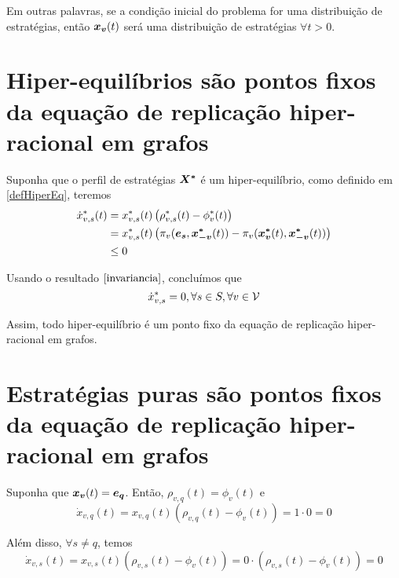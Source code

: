 Em outras palavras, se a condição inicial do problema for uma distribuição de estratégias, então $\boldsymbol{x_v}(t)$ será uma distribuição de estratégias $\forall t>0$.


\section{Hiper-equilíbrios são pontos fixos da equação de replicação hiper-racional em grafos}

Suponha que o perfil de estratégias $\boldsymbol{X^*}$ é um hiper-equilíbrio, como definido em \ref{defHiperEq}, teremos
\begin{equation}
\begin{split}
    \Dot{x}_{v,s}^*(t)&=x_{v,s}^*(t)\left(\rho_{v,s}^*(t)-\phi_v^*(t)\right)\\
                      &=x_{v,s}^*(t)\left(\pi_v(\boldsymbol{e_s},\boldsymbol{x^*_{-v}}(t))
                      -\pi_v(\boldsymbol{x^*_v}(t),\boldsymbol{x^*_{-v}}(t))\right)\\
                      &\leq 0
\end{split}
\end{equation}

Usando o resultado $\eqref{invariancia}$, concluímos que 
\begin{equation}
    \Dot{x}_{v,s}^*=0,\forall s\in S,\forall v\in\mathcal{V}
\end{equation}

Assim, todo hiper-equilíbrio é um ponto fixo da equação de replicação hiper-racional em grafos.


\section{Estratégias puras são pontos fixos da equação de replicação hiper-racional em grafos}

Suponha que $\boldsymbol{x_v}(t)=\boldsymbol{e_q}$. Então, $\rho_{v,q}(t)=\phi_v(t)$ e
\begin{equation}
    \Dot{x}_{v,q}(t)=x_{v,q}(t)\left(\rho_{v,q}(t)-\phi_v(t)\right)
                      =1\cdot 0 = 0
\end{equation}

Além disso, $\forall s\neq q$, temos
\begin{equation}
    \Dot{x}_{v,s}(t)=x_{v,s}(t)\left(\rho_{v,s}(t)-\phi_v(t)\right)
                      =0\cdot \left(\rho_{v,s}(t)-\phi_v(t)\right) = 0
\end{equation}


